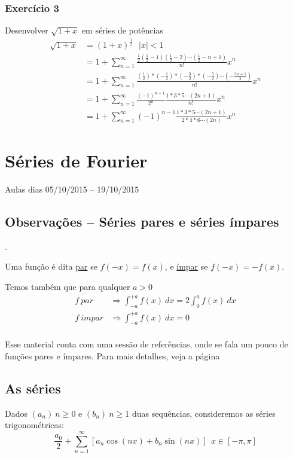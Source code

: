 \documentclass[12pt,openany, letterpaper]{book}
\newcommand{\soma}[2][n]{\sum_{{#1} = #2}^\infty}
\newcommand{\E}[1]{Exercício #1}
\begin{document}
{{\subsection*{\E 3} Desenvolver $\sqrt{1+x}$ em séries de potências \begin{align*}
    \sqrt{1 + x} &= (1+x)^{\frac{1}{2}} \ \ \ |x| < 1 \\
    &= 1 + \soma{1} \frac{\frac{1}{2}\left(\frac{1}{2}-1\right)\left(\frac{1}{2} - 2\right)\cdots \left(\frac{1}{2} - n + 1\right)}{n!}x^n \\
    &= 1 + \soma{1} \frac{\left(\frac{1}{2}\right)*\left(-\frac{1}{2}\right)*\left(-\frac{3}{2}\right)*\left(-\frac{5}{2}\right) \cdots \left(-\frac{2n+1}{2}\right)}{n!}x^n \\
    &= 1 + \soma{1} \frac{(-1)^{n-1}}{2^n} \frac{1*3*5\cdots(2n+1)}{n!}x^n \\
    &= 1 + \soma{1} (-1)^{n-1} \frac{1*3*5\cdots(2n+1)}{2*4*6\cdots(2n)} x^n
\end{align*}


\chapter{Séries de Fourier}{Aulas dias 05/10/2015 -- 19/10/2015}
\label{chap:c6}
\section{Observações -- Séries pares e séries ímpares}.

\hspace{5mm} Uma função é dita \underline{par} se $f(-x) = f(x)$, e \underline{ímpar} se $f(-x) = -f(x)$.

Temos também que para qualquer $a > 0$\begin{align*}
    f \ par &\Rightarrow \int_{-a}^{+a} f(x) \ dx = 2 \int_0^a f(x) \ dx \\
    f \ impar &\Rightarrow \int_{-a}^{+a} f(x) \ dx = 0 \\
\end{align*}

Esse material conta com uma sessão de referências, onde se fala um pouco de funções pares e ímpares. Para mais detalhes, veja a página \pageref{ref-3}

\section{As séries}

\hspace{5mm}Dados $(a_n) \ n \geq 0$ e $(b_n) \ n \geq 1$ duas sequências, consideremos as séries trigonométricas: $$\frac{a_0}{2} + \soma{1} [a_n \cos (nx)+ b_n\sin (nx)] \ \ x \in [-\pi, \pi]$$ 

}}
\end{document}
